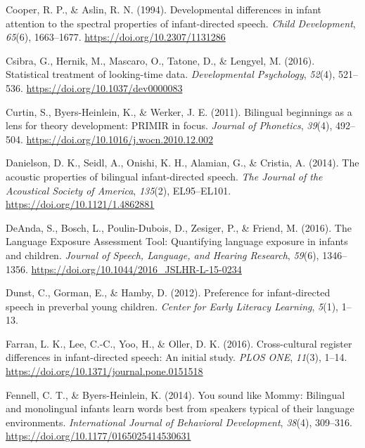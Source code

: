 \documentclass[,man,floatsintext]{apa6}
\begin{document}
\leavevmode\hypertarget{ref-cooper_1994}{}%
Cooper, R. P., \& Aslin, R. N. (1994). Developmental differences in infant attention to the spectral properties of infant-directed speech. \emph{Child Development}, \emph{65}(6), 1663--1677. \url{https://doi.org/10.2307/1131286}

\leavevmode\hypertarget{ref-csibra_2016}{}%
Csibra, G., Hernik, M., Mascaro, O., Tatone, D., \& Lengyel, M. (2016). Statistical treatment of looking-time data. \emph{Developmental Psychology}, \emph{52}(4), 521--536. \url{https://doi.org/10.1037/dev0000083}

\leavevmode\hypertarget{ref-curtin_2011}{}%
Curtin, S., Byers-Heinlein, K., \& Werker, J. E. (2011). Bilingual beginnings as a lens for theory development: PRIMIR in focus. \emph{Journal of Phonetics}, \emph{39}(4), 492--504. \url{https://doi.org/10.1016/j.wocn.2010.12.002}

\leavevmode\hypertarget{ref-danielson_2014}{}%
Danielson, D. K., Seidl, A., Onishi, K. H., Alamian, G., \& Cristia, A. (2014). The acoustic properties of bilingual infant-directed speech. \emph{The Journal of the Acoustical Society of America}, \emph{135}(2), EL95--EL101. \url{https://doi.org/10.1121/1.4862881}

\leavevmode\hypertarget{ref-deanda_2016}{}%
DeAnda, S., Bosch, L., Poulin-Dubois, D., Zesiger, P., \& Friend, M. (2016). The Language Exposure Assessment Tool: Quantifying language exposure in infants and children. \emph{Journal of Speech, Language, and Hearing Research}, \emph{59}(6), 1346--1356. \url{https://doi.org/10.1044/2016_JSLHR-L-15-0234}

\leavevmode\hypertarget{ref-dunst_2012}{}%
Dunst, C., Gorman, E., \& Hamby, D. (2012). Preference for infant-directed speech in preverbal young children. \emph{Center for Early Literacy Learning}, \emph{5}(1), 1--13.

\leavevmode\hypertarget{ref-farran_2016}{}%
Farran, L. K., Lee, C.-C., Yoo, H., \& Oller, D. K. (2016). Cross-cultural register differences in infant-directed speech: An initial study. \emph{PLOS ONE}, \emph{11}(3), 1--14. \url{https://doi.org/10.1371/journal.pone.0151518}

\leavevmode\hypertarget{ref-fennell_2014}{}%
Fennell, C. T., \& Byers-Heinlein, K. (2014). You sound like Mommy: Bilingual and monolingual infants learn words best from speakers typical of their language environments. \emph{International Journal of Behavioral Development}, \emph{38}(4), 309--316. \url{https://doi.org/10.1177/0165025414530631}
\end{document}
